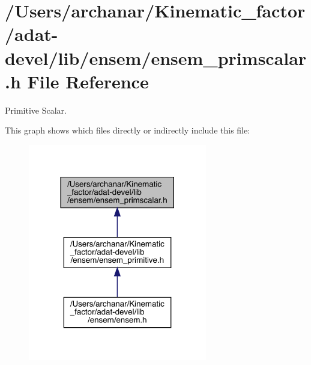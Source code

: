 \hypertarget{adat-devel_2lib_2ensem_2ensem__primscalar_8h}{}\section{/\+Users/archanar/\+Kinematic\+\_\+factor/adat-\/devel/lib/ensem/ensem\+\_\+primscalar.h File Reference}
\label{adat-devel_2lib_2ensem_2ensem__primscalar_8h}


Primitive Scalar.  


This graph shows which files directly or indirectly include this file\+:
\nopagebreak
\begin{figure}[H]
\begin{center}
\leavevmode
\includegraphics[width=221pt]{d1/d85/adat-devel_2lib_2ensem_2ensem__primscalar_8h__dep__incl}
\end{center}
\end{figure}
